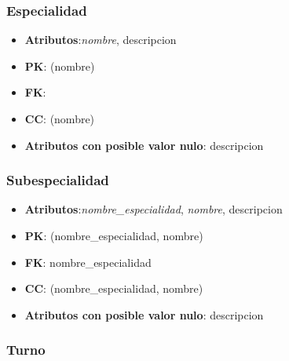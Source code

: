 \documentclass[a4paper,11pt]{article}
\begin{document}
\subsubsection{\textbf{Especialidad}}

\begin{itemize}

\item 
\textbf{Atributos}:\emph{nombre}, descripcion

\item 
\textbf{PK}: (nombre)

\item
\textbf{FK}:

\item 
\textbf{CC}: (nombre)

\item 
\textbf{Atributos con posible valor nulo}: descripcion

\end{itemize}
\subsubsection{\textbf{Subespecialidad}}

\begin{itemize}

\item 
\textbf{Atributos}:\emph{nombre\_especialidad}, \emph{nombre}, descripcion

\item 
\textbf{PK}: (nombre\_especialidad, nombre)

\item
\textbf{FK}: nombre\_especialidad

\item 
\textbf{CC}: (nombre\_especialidad, nombre)

\item 
\textbf{Atributos con posible valor nulo}: descripcion

\end{itemize}
\subsubsection{\textbf{Turno}}
\end{document}
